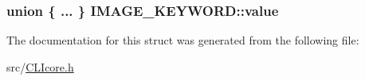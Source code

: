 \subsubsection[{value}]{\setlength{\rightskip}{0pt plus 5cm}union \{ ... \}   I\+M\+A\+G\+E\+\_\+\+K\+E\+Y\+W\+O\+R\+D\+::value}\label{structIMAGE__KEYWORD_a93da8b101ca9f8e620803c6e39316b0e}


The documentation for this struct was generated from the following file\+:\begin{DoxyCompactItemize}
\item 
src/\hyperlink{CLIcore_8h}{C\+L\+Icore.\+h}\end{DoxyCompactItemize}
